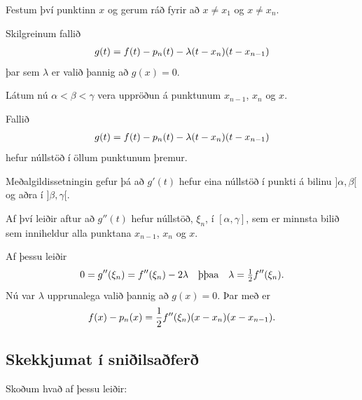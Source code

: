 \documentclass[letterpaper,10pt,icelandic]{sphinxmanual}
\begin{document}
Festum því punktinn \(x\) og gerum ráð fyrir að \(x\neq x_1\) og
\(x\neq x_n\).

Skilgreinum fallið
\begin{gather}
\begin{split}g(t)=f(t)-p_n(t)-\lambda(t-x_n)(t-x_{n-1})\end{split}\notag
\end{gather}
þar sem \(\lambda\) er valið þannig að \(g(x)=0\).

Látum nú \(\alpha<\beta<\gamma\) vera uppröðun á punktunum
\(x_{n-1}\), \(x_n\) og \(x\).

Fallið
\begin{gather}
\begin{split}g(t)=f(t)-p_n(t)-\lambda(t-x_n)(t-x_{n-1})\end{split}\notag
\end{gather}
hefur núllstöð í öllum punktunum þremur.

Meðalgildissetningin gefur þá að \(g'(t)\) hefur eina núllstöð í
punkti á bilinu \(]\alpha,\beta[\) og aðra í \(]\beta,\gamma[\).

Af því leiðir aftur að \(g''(t)\) hefur núllstöð, \(\xi_n\), í
\([\alpha,\gamma]\), sem er minnsta bilið sem inniheldur alla
punktana \(x_{n-1}\), \(x_n\) og \(x\).

Af þessu leiðir
\begin{gather}
\begin{split}0=g''(\xi_n)=f''(\xi_n)-2\lambda \quad \text{þþaa} \quad
\lambda=\tfrac 12 f''(\xi_n).\end{split}\notag
\end{gather}
Nú var \(\lambda\) upprunalega valið þannig að \(g(x)=0\). Þar
með er
\begin{gather}
\begin{split}f(x) - p_n(x) = \frac{1}{2}f''(\xi_n)(x-x_n)(x-x_{n-1}).\end{split}\notag
\end{gather}

\subsection{Skekkjumat í sniðilsaðferð}
\label{kafli02:skekkjumat-i-sniilsafer}
Skoðum hvað af þessu leiðir:
\end{document}
